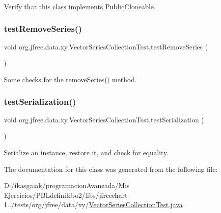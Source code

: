 Verify that this class implements \mbox{\hyperlink{}{Public\+Cloneable}}. \mbox{\label{classorg_1_1jfree_1_1data_1_1xy_1_1_vector_series_collection_test_ac120122258f8d7f3a463e346ddeda649}} 
\subsubsection{\texorpdfstring{test\+Remove\+Series()}{testRemoveSeries()}}
{\footnotesize\ttfamily void org.\+jfree.\+data.\+xy.\+Vector\+Series\+Collection\+Test.\+test\+Remove\+Series (\begin{DoxyParamCaption}{ }\end{DoxyParamCaption})}

Some checks for the remove\+Series() method. \mbox{\label{classorg_1_1jfree_1_1data_1_1xy_1_1_vector_series_collection_test_a6315e1fc03cb75fcf51cf6aae0d725a3}} 
\subsubsection{\texorpdfstring{test\+Serialization()}{testSerialization()}}
{\footnotesize\ttfamily void org.\+jfree.\+data.\+xy.\+Vector\+Series\+Collection\+Test.\+test\+Serialization (\begin{DoxyParamCaption}{ }\end{DoxyParamCaption})}

Serialize an instance, restore it, and check for equality. 

The documentation for this class was generated from the following file\+:\begin{DoxyCompactItemize}
\item 
D\+:/ikasgaiak/programacion\+Avanzada/\+Mis Ejercicios/\+P\+B\+Ldefinitibo2/libs/jfreechart-\/1../tests/org/jfree/data/xy/\mbox{\hyperlink{_vector_series_collection_test_8java}{Vector\+Series\+Collection\+Test.\+java}}\end{DoxyCompactItemize}
